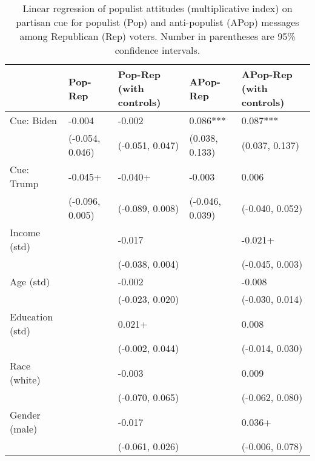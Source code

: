 \begin{table}[th!]
\centering
\caption{Linear regression of populist attitudes (multiplicative index) on partisan cue for populist (Pop) and anti-populist (APop) messages among Republican (Rep) voters. Number in parentheses are 95\% confidence intervals.}
\label{tab-reg-rep-popmul.tex}
\begin{threeparttable}
\begin{tabular}{lC{3cm}C{3cm}C{3cm}C{3cm}}
\toprule
                &         Pop-Rep & Pop-Rep (with controls) &        APop-Rep & APop-Rep (with controls) \\
\midrule
     Cue: Biden &          -0.004 &                  -0.002 &        0.086*** &                 0.087*** \\
                & (-0.054, 0.046) &         (-0.051, 0.047) &  (0.038, 0.133) &           (0.037, 0.137) \\
     Cue: Trump &         -0.045+ &                 -0.040+ &          -0.003 &                    0.006 \\
                & (-0.096, 0.005) &         (-0.089, 0.008) & (-0.046, 0.039) &          (-0.040, 0.052) \\
   Income (std) &                 &                  -0.017 &                 &                  -0.021+ \\
                &                 &         (-0.038, 0.004) &                 &          (-0.045, 0.003) \\
      Age (std) &                 &                  -0.002 &                 &                   -0.008 \\
                &                 &         (-0.023, 0.020) &                 &          (-0.030, 0.014) \\
Education (std) &                 &                  0.021+ &                 &                    0.008 \\
                &                 &         (-0.002, 0.044) &                 &          (-0.014, 0.030) \\
   Race (white) &                 &                  -0.003 &                 &                    0.009 \\
                &                 &         (-0.070, 0.065) &                 &          (-0.062, 0.080) \\
  Gender (male) &                 &                  -0.017 &                 &                   0.036+ \\
                &                 &         (-0.061, 0.026) &                 &          (-0.006, 0.078) \\

\end{tabular}
\end{threeparttable}
\end{table}
